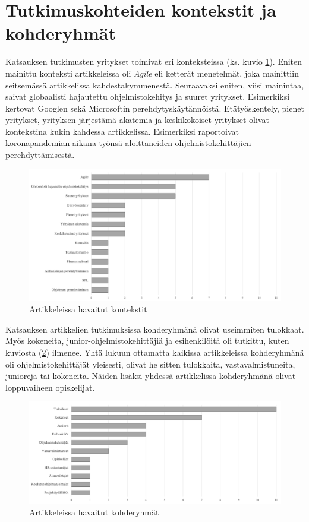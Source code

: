 \documentclass[utf8]{gradu3}
\begin{document}
\section{Tutkimuskohteiden kontekstit ja kohderyhmät}

Katsauksen tutkimusten yritykset toimivat eri konteksteissa (ks. kuvio \ref{kuvio:kontekstit}). Eniten mainittu konteksti artikkeleissa oli \textit{Agile} eli ketterät menetelmät, joka mainittiin seitsemässä artikkelissa kahdestakymmenestä. Seuraavaksi eniten, viisi mainintaa, saivat globaalisti hajautettu ohjelmistokehitys ja suuret yritykset. Esimerkiksi \textcite{johnson-senges-2010} kertovat Googlen sekä \textcite{rodeghero-ym-2021} \textcite{ju-ym-2021} Microsoftin perehdytyskäytännöistä. Etätyöskentely, pienet yritykset, yrityksen järjestämä akatemia ja keskikokoiset yritykset olivat kontekstina kukin kahdessa artikkelissa. Esimerkiksi \textcite{rodeghero-ym-2021} raportoivat koronapandemian aikana työnsä aloittaneiden ohjelmistokehittäjien perehdyttämisestä.

\begin{figure}[h]
    \centering
    \includegraphics[width=\textwidth]{media/kontekstit.png}
    \caption{Artikkeleissa havaitut kontekstit}
    \label{kuvio:kontekstit}
\end{figure}

Katsauksen artikkelien tutkimuksissa kohderyhmänä olivat useimmiten tulokkaat. Myös kokeneita, junior-ohjelmistokehittäjiä ja esihenkilöitä oli tutkittu, kuten kuviosta (\ref{kuvio:kohderyhmat}) ilmenee. Yhtä lukuun ottamatta kaikissa artikkeleissa kohderyhmänä oli ohjelmistokehittäjät yleisesti, olivat he sitten tulokkaita, vastavalmistuneita, junioreja tai kokeneita. Näiden lisäksi yhdessä artikkelissa kohderyhmänä olivat loppuvaiheen opiskelijat.

\begin{figure}[h]
    \centering
    \includegraphics[width=\textwidth]{media/kohderyhmat.png}
    \caption{Artikkeleissa havaitut kohderyhmät}
    \label{kuvio:kohderyhmat}
\end{figure}
\end{document}
